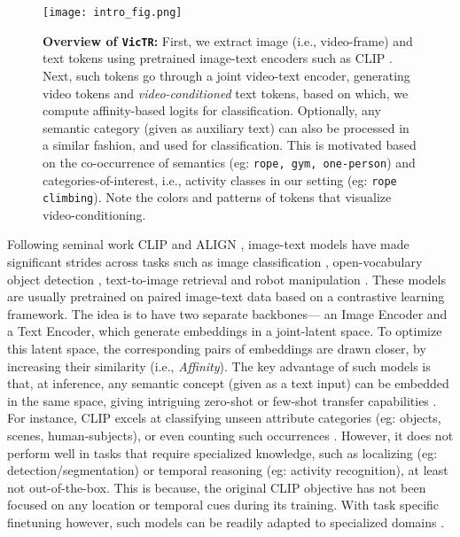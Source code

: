 \documentclass[10pt,twocolumn,letterpaper]{article}
\newcommand{\ours}{\texttt{VicTR}}
\begin{document}
\begin{figure}[t!]
    \centering
    \texttt{[image: intro\_fig.png]}
    \caption{\textbf{Overview of \ours:} First, we extract image (i.e., video-frame) and text tokens using pretrained image-text encoders such as CLIP \cite{radford2021clip}. Next, such tokens go through a joint video-text encoder, generating video tokens and \textit{video-conditioned} text tokens, based on which, we compute affinity-based logits for classification. Optionally, any semantic category (given as auxiliary text) can also be processed in a similar fashion, and used for classification. This is motivated based on the co-occurrence of semantics (eg: \texttt{rope, gym, one-person}) and categories-of-interest, i.e., activity classes in our setting (eg: \texttt{rope climbing}). Note the colors and patterns of tokens that visualize video-conditioning.}
    \label{fig:overview}
    \vspace{-2mm}
\end{figure}

Following seminal work CLIP \cite{radford2021clip} and ALIGN \cite{jia2021align}, image-text models have made significant strides across tasks such as image classification \cite{yuan2021florence, zhai2022lit, yan2022videococa}, open-vocabulary object detection \cite{gu2021vild, minderer2022simple}, text-to-image retrieval \cite{singh2022flava, yao2021filip} and robot manipulation \cite{jiang2022vima, zeng2022socratic}. These models are usually pretrained on paired image-text data based on a contrastive learning framework. The idea is to have two separate backbones--- an Image Encoder and a Text Encoder, which generate embeddings in a joint-latent space. To optimize this latent space, the corresponding pairs of embeddings are drawn closer, by increasing their similarity (i.e., \textit{Affinity}). The key advantage of such models is that, at inference, any semantic concept (given as a text input) can be embedded in the same space, giving intriguing zero-shot or few-shot transfer capabilities \cite{zeng2022socratic, alayrac2022flamingo}. For instance, CLIP \cite{radford2021clip} excels at classifying unseen attribute categories (eg: objects, scenes, human-subjects), or even counting such occurrences \cite{zeng2022socratic}. However, it does not perform well in tasks that require specialized knowledge, such as localizing (eg: detection/segmentation) or temporal reasoning (eg: activity recognition), at least not out-of-the-box. This is because, the original CLIP objective has not been focused on any location or temporal cues during its training. With task specific finetuning however, such models can be readily adapted to specialized domains \cite{gu2021vild, ma2022xclip}.
\end{document}
